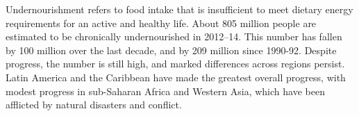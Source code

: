 ﻿Undernourishment refers to food intake that is insufficient to meet dietary energy requirements for an active and healthy life. About 805 million people are estimated to be chronically undernourished in 2012–14. This number has fallen by 100 million over the last decade, and by 209 million since 1990-92. Despite progress, the number is still high, and marked differences across regions persist. Latin America and the Caribbean have made the greatest overall progress, with modest progress in sub-Saharan Africa and Western Asia, which have been afflicted by natural disasters and conflict.